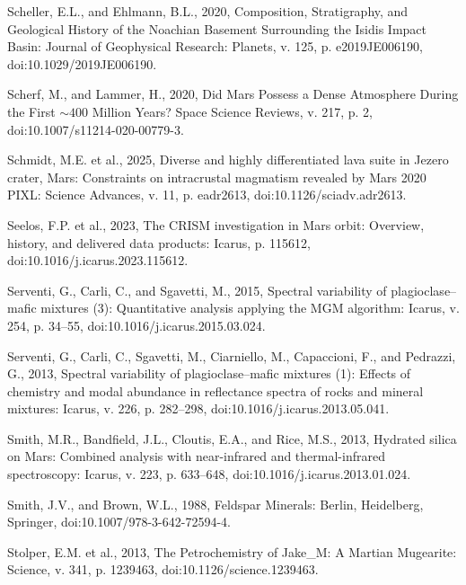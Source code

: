 \documentclass[11pt]{article}
\begin{document}
\begin{thebibliography}{99}
 Scheller, E.L., and Ehlmann, B.L., 2020, Composition, Stratigraphy, and Geological History of the Noachian Basement Surrounding the Isidis Impact Basin: Journal of Geophysical Research: Planets, v. 125, p. e2019JE006190, doi:10.1029/2019JE006190.

 Scherf, M., and Lammer, H., 2020, Did Mars Possess a Dense Atmosphere During the First $\sim400$ Million Years? Space Science Reviews, v. 217, p. 2, doi:10.1007/s11214-020-00779-3.

 Schmidt, M.E. et al., 2025, Diverse and highly differentiated lava suite in Jezero crater, Mars: Constraints on intracrustal magmatism revealed by Mars 2020 PIXL: Science Advances, v. 11, p. eadr2613, doi:10.1126/sciadv.adr2613.

 Seelos, F.P. et al., 2023, The CRISM investigation in Mars orbit: Overview, history, and delivered data products: Icarus, p. 115612, doi:10.1016/j.icarus.2023.115612.

 Serventi, G., Carli, C., and Sgavetti, M., 2015, Spectral variability of plagioclase--mafic mixtures (3): Quantitative analysis applying the MGM algorithm: Icarus, v. 254, p. 34--55, doi:10.1016/j.icarus.2015.03.024.

 Serventi, G., Carli, C., Sgavetti, M., Ciarniello, M., Capaccioni, F., and Pedrazzi, G., 2013, Spectral variability of plagioclase--mafic mixtures (1): Effects of chemistry and modal abundance in reflectance spectra of rocks and mineral mixtures: Icarus, v. 226, p. 282--298, doi:10.1016/j.icarus.2013.05.041.

 Smith, M.R., Bandfield, J.L., Cloutis, E.A., and Rice, M.S., 2013, Hydrated silica on Mars: Combined analysis with near-infrared and thermal-infrared spectroscopy: Icarus, v. 223, p. 633--648, doi:10.1016/j.icarus.2013.01.024.

 Smith, J.V., and Brown, W.L., 1988, Feldspar Minerals: Berlin, Heidelberg, Springer, doi:10.1007/978-3-642-72594-4.

 Stolper, E.M. et al., 2013, The Petrochemistry of Jake\_M: A Martian Mugearite: Science, v. 341, p. 1239463, doi:10.1126/science.1239463.


\end{thebibliography}
\end{document}
